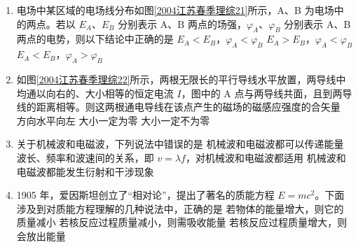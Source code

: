 \documentclass[\gkver]{gaokaozhenti}
\begin{document}
\begin{enumerate}
\item
电场中某区域的电场线分布如图\ref{2004江苏春季理综21}所示，A、B 为电场中的两点。若以 $E_{A}$、$E_{B}$ 分别表示 A、B 两点的场强，$\varphi_{A}$、$\varphi_{B}$ 分别表示 A、B 两点的电势，则以下结论中正确的是
{$E_{A}<E_{B}$，$\varphi_{A}<\varphi_{B}$}
{$E_{A}>E_{B}$，$\varphi_{A}<\varphi_{B}$}
{$E_{A}<E_{B}$，$\varphi_{A}>\varphi_{B}$}

\item
如图\ref{2004江苏春季理综22}所示，两根无限长的平行导线水平放置，两导线中均通以向右的、大小相等的恒定电流 $I$，图中的 A 点与两导线共面，且到两导线的距离相等。则这两根通电导线在该点产生的磁场的磁感应强度的合矢量
{方向水平向左}
{大小一定为零}
{大小一定不为零}

\item
关于机械波和电磁波，下列说法中错误的是
{机械波和电磁波都可以传递能量}
{波长、频率和波速间的关系，即 $v=\lambda f$，对机械波和电磁波都适用}
{机械波和电磁波都能发生衍射和干涉现象}

\item
1905 年，爱因斯坦创立了“相对论”，提出了著名的质能方程 $E=mc^{2}$。下面涉及到对质能方程理解的几种说法中，正确的是
{若物体的能量增大，则它的质量减小}
{若核反应过程质量减小，则需吸收能量}
{若核反应过程质量增大，则会放出能量}


\end{enumerate}
\end{document}
